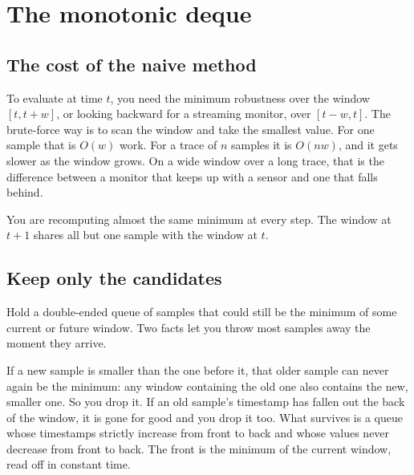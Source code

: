 \chapter{The monotonic deque}
\label{ch:deque}

\section{The cost of the naive method}

To evaluate  at time $t$, you need the minimum robustness over the window $[t, t+w]$, or looking backward for a streaming monitor, over $[t-w, t]$. The brute-force way is to scan the window and take the smallest value. For one sample that is $O(w)$ work. For a trace of $n$ samples it is $O(nw)$, and it gets slower as the window grows. On a wide window over a long trace, that is the difference between a monitor that keeps up with a sensor and one that falls behind.

You are recomputing almost the same minimum at every step. The window at $t+1$ shares all but one sample with the window at $t$.

\section{Keep only the candidates}

Hold a double-ended queue of samples that could still be the minimum of some current or future window. Two facts let you throw most samples away the moment they arrive.

If a new sample is smaller than the one before it, that older sample can never again be the minimum: any window containing the old one also contains the new, smaller one. So you drop it. If an old sample's timestamp has fallen out the back of the window, it is gone for good and you drop it too. What survives is a queue whose timestamps strictly increase from front to back and whose values never decrease from front to back. The front is the minimum of the current window, read off in constant time.

